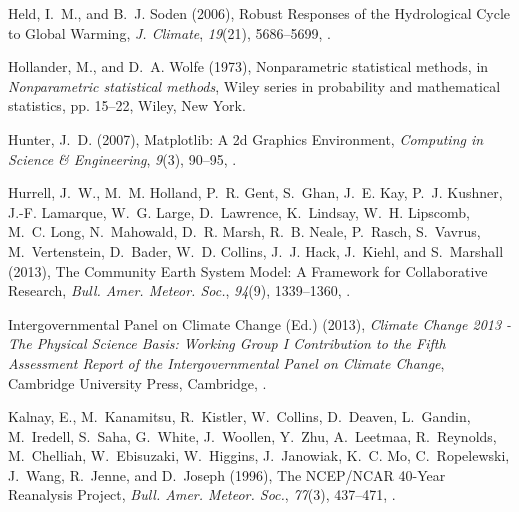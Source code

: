 \documentclass[final, double]{ua-thesis}
\begin{document}
\begin{thebibliography}{}
Held, I.~M., and B.~J. Soden (2006), Robust {Responses} of the {Hydrological}
  {Cycle} to {Global} {Warming}, \textit{J. Climate}, \textit{19}(21),
  5686--5699, .

Hollander, M., and D.~A. Wolfe (1973), Nonparametric statistical methods, in
  \textit{Nonparametric statistical methods}, Wiley series in probability and
  mathematical statistics, pp. 15--22, Wiley, New York.

Hunter, J.~D. (2007), Matplotlib: {A} 2d {Graphics} {Environment},
  \textit{Computing in Science \& Engineering}, \textit{9}(3), 90--95,
  .

Hurrell, J.~W., M.~M. Holland, P.~R. Gent, S.~Ghan, J.~E. Kay, P.~J. Kushner,
  J.-F. Lamarque, W.~G. Large, D.~Lawrence, K.~Lindsay, W.~H. Lipscomb, M.~C.
  Long, N.~Mahowald, D.~R. Marsh, R.~B. Neale, P.~Rasch, S.~Vavrus,
  M.~Vertenstein, D.~Bader, W.~D. Collins, J.~J. Hack, J.~Kiehl, and
  S.~Marshall (2013), The {Community} {Earth} {System} {Model}: {A} {Framework}
  for {Collaborative} {Research}, \textit{Bull. Amer. Meteor. Soc.},
  \textit{94}(9), 1339--1360, .

{Intergovernmental Panel on Climate Change} (Ed.) (2013), \textit{Climate
  {Change} 2013 - {The} {Physical} {Science} {Basis}: {Working} {Group} {I}
  {Contribution} to the {Fifth} {Assessment} {Report} of the
  {Intergovernmental} {Panel} on {Climate} {Change}}, Cambridge University
  Press, Cambridge, .

Kalnay, E., M.~Kanamitsu, R.~Kistler, W.~Collins, D.~Deaven, L.~Gandin,
  M.~Iredell, S.~Saha, G.~White, J.~Woollen, Y.~Zhu, A.~Leetmaa, R.~Reynolds,
  M.~Chelliah, W.~Ebisuzaki, W.~Higgins, J.~Janowiak, K.~C. Mo, C.~Ropelewski,
  J.~Wang, R.~Jenne, and D.~Joseph (1996), The {NCEP}/{NCAR} 40-{Year}
  {Reanalysis} {Project}, \textit{Bull. Amer. Meteor. Soc.}, \textit{77}(3),
  437--471, .


\end{thebibliography}
\end{document}
